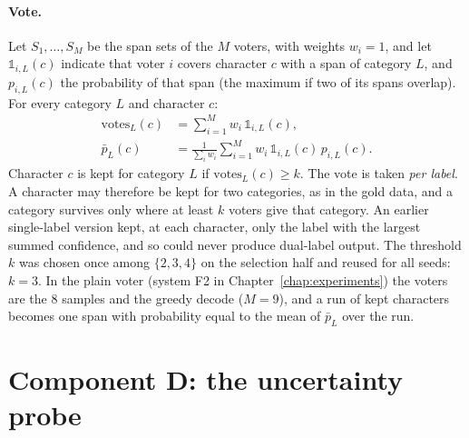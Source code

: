 \paragraph{Vote.}
Let $S_1, \dots, S_M$ be the span sets of the $M$ voters, with weights $w_i = 1$, and let $\mathbb{1}_{i,L}(c)$ indicate that voter $i$ covers character $c$ with a span of category $L$, and $p_{i,L}(c)$ the probability of that span (the maximum if two of its spans overlap). For every category $L$ and character $c$:
\begin{align}
    \mathrm{votes}_L(c) &= \sum_{i=1}^{M} w_i\, \mathbb{1}_{i,L}(c), \label{eq:votes}\\
    \bar p_L(c) &= \frac{1}{\sum_i w_i} \sum_{i=1}^{M} w_i\, \mathbb{1}_{i,L}(c)\, p_{i,L}(c). \label{eq:pbar}
\end{align}
Character $c$ is kept for category $L$ if $\mathrm{votes}_L(c) \ge k$. The vote is taken \emph{per label}. A character may therefore be kept for two categories, as in the gold data, and a category survives only where at least $k$ voters give that category. An earlier single-label version kept, at each character, only the label with the largest summed confidence, and so could never produce dual-label output. The threshold $k$ was chosen once among $\{2, 3, 4\}$ on the selection half and reused for all seeds: $k = 3$. In the plain voter (system F2 in Chapter~\ref{chap:experiments}) the voters are the 8 samples and the greedy decode ($M = 9$), and a run of kept characters becomes one span with probability equal to the mean of $\bar p_L$ over the run.

\section{Component D: the uncertainty probe}\label{sec:probe}

